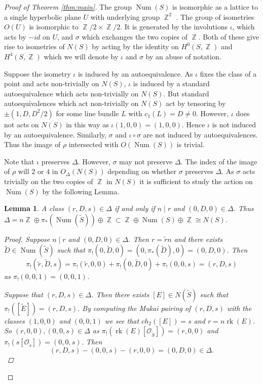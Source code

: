 \documentclass[a4paper, 12pt, twoside]{amsart}
\theoremstyle{plain}
\newtheorem{lemma}[theorem]{Lemma}
\theoremstyle{definition}
\DeclareMathOperator{\iso}{\cong}
\DeclareMathOperator{\rk}{rk}
\DeclareMathOperator{\num}{Num}
\DeclareMathOperator{\Z}{\mathbb{Z}}
\begin{document}
\begin{proof}[Proof of Theorem \ref{thm:main}]
The group $\num(S)$ is isomorphic as a lattice to a single hyperbolic
plane $U$ with underlying group $\Z^2$ \cite[\S 1]{MR1038716}. The
group of isometries $O(U)$ is isomorphic to $\Z/2 \times \Z/2$. It is
generated by the involutions $\iota$, which acts by $-id$ on $U$, and
$\sigma$ which exchanges the two copies of $\Z$. Both of these give
rise to isometries of $N(S)$ by acting by the identity on $H^0(S,\Z)$
and $H^4(S,\Z)$ which we will denote by $\iota$ and $\sigma$ by an
abuse of notation.

Suppose the isometry $\iota$ is induced by an autoequivalence. As
$\iota$ fixes the class of a point and acts non-trivially on $N(S)$,
$\iota$ is induced by a standard autoequivalence which acts
non-trivially on $N(S)$. But standard autoequivalences which act
non-trivially on $N(S)$ act by tensoring by $\pm (1,D,D^2/2)$ for some
line bundle $L$ with $c_1(L) = D \ne 0$. However, $\iota$ does not
acts on $N(S)$ in this way as $\iota(1,0,0)=(1,0,0)$. Hence $\iota$ is
not induced by an autoequivalence. Similarly, $\sigma$ and
$\iota \circ \sigma$ are not induced by autoequivalences. Thus the
image of $\rho$ intersected with $O(\num(S))$ is trivial.

Note that $\iota$ preserves $\Delta$. However, $\sigma$ may not
preserve $\Delta$. The index of the image of $\rho$ will $2$ or $4$ in
$O_{\Delta}(N(S))$ depending on whether $\sigma$ preserves
$\Delta$. As $\sigma$ acts trivially on the two copies of $\Z$ in
$N(S)$ it is sufficient to study the action on $\num(S)$ by the
following Lemma.

\begin{lemma}
  A class $(r,D,s) \in \Delta$ if and only if $n \mid r$ and
  $(0,D,0) \in \Delta$. Thus
  $\Delta = n\Z \oplus \pi_*(\num(\widetilde{S})) \oplus \Z \subset \Z
  \oplus \num(S) \oplus \Z \iso N(S)$.
  \begin{proof}
    Suppose $n \mid r$ and $(0,D,0) \in \Delta$. Then
    $r = \tilde{r}n$ and there exists
    $\widetilde{D} \in \num(\widetilde{S})$ such that
    $\pi_!(0,\widetilde{D},0) = (0,\pi_*(\widetilde{D}),0) =
    (0,D,0)$. Then
      \[
        \pi_!(\tilde{r},\widetilde{D},s) = \pi_!(\tilde{r},0,0) +
        \pi_!(0,\widetilde{D},0) + \pi_!(0,0,s) = (r,D,s)
      \] 
      as $\pi_!(0,0,1) = (0,0,1)$.

      Suppose that $(r,D,s) \in \Delta$. Then there exists
      $[E] \in N(\widetilde{S})$ such that
      $\pi_!([\widetilde{E}]) = (r,D,s)$. By computing the Mukai
      pairing of $(r,D,s)$ with the classes $(1,0,0)$ and $(0,0,1)$ we
      see that $ch_2([E])= s$ and $r = n \rk(E)$. So
      $(r,0,0), (0,0,s) \in \Delta$ as
      $\pi_!(\rk(E)[\mathcal{O}_{\widetilde{S}}]) = (r,0,0)$ and
      $\pi_!(s[\mathcal{O}_{\tilde{s}}]) = (0,0,s)$. Then
      \[
        (r,D,s) - (0,0,s) - (r,0,0) = (0,D,0) \in \Delta.
      \]
  \end{proof}
\end{lemma}


\end{proof}
\end{document}
